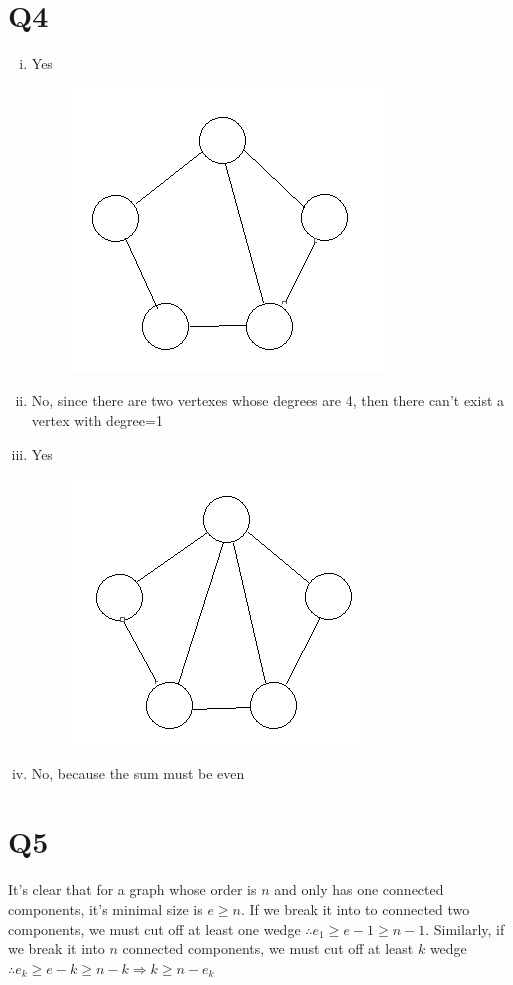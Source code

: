 \documentclass[12pt]{article}
\begin{document}
\section{Q4}
\begin{enumerate}[(i)]
\item 
Yes
\begin{figure}[H]
\centering
\includegraphics[scale=0.5]{P2.jpg}
\end{figure}
\item
No, since there are two vertexes whose degrees are 4, then there can't exist a vertex with degree=1
\item
Yes
\begin{figure}[H]
\centering
\includegraphics[scale=0.5]{P3.jpg}
\end{figure}
\item
No, because the sum must be even
\end{enumerate}
\section{Q5}
It's clear that for a graph whose order is $n$ and only has one connected components, it's minimal size is $e\ge n$. If we break it into to connected two components, we must cut off at least one wedge $\therefore e_1\ge e-1\ge n-1$. Similarly, if we break it into $n$ connected components, we must cut off at least $k$ wedge $\therefore e_k\ge e-k\ge n-k\Rightarrow k\ge n-e_k $
\end{document}
